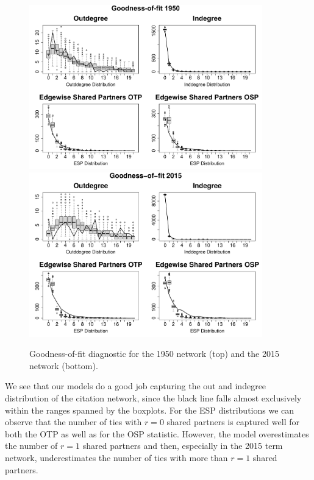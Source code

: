 \documentclass[headsepline=true, abstracton]{scrartcl}
\begin{document}
\begin{figure}[bt]
	\begin{center}
		\includegraphics[width=0.9\textwidth]{GOF_1950}\\
		\vspace{1cm}
		\includegraphics[width=0.9\textwidth]{GOF_2015}
		\vspace{0.1cm}
		\caption{Goodness-of-fit diagnostic for the 1950 network (top) and the 2015 network (bottom).}
		\label{GOF}
		\vspace{-.25cm}
	\end{center}
\end{figure} 


We see that our models do a good job capturing the out and indegree distribution of the citation network, since the black line falls almost exclusively within the ranges spanned by the boxplots. For the ESP distributions we can observe that the number of ties with $r=0$ shared partners is captured well for both the OTP as well as for the OSP statistic. However, the model overestimates the number of $r=1$ shared partners and then, especially in the 2015 term network, underestimates the number of ties with more than $r=1$ shared partners. 
\end{document}
